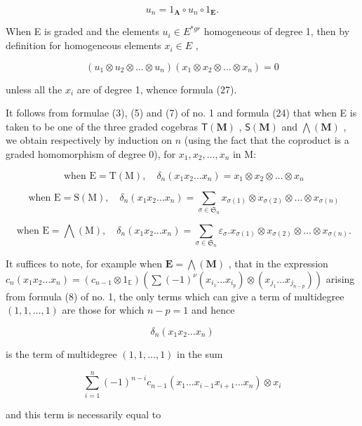 \[
u _ {n} = 1 _ {\mathbf {A}} \circ u _ {n} \circ 1 _ {\mathbf {E}}.
\]

When E is graded and the elements \(u_{i} \in E^{*gr}\) homogeneous of degree 1, then by definition for homogeneous elements \(x_{i} \in E\) ,

\[
(u _ {1} \otimes u _ {2} \otimes \dots \otimes u _ {n}) (x _ {1} \otimes x _ {2} \otimes \dots \otimes x _ {n}) = 0
\]

unless all the \(x_{i}\) are of degree 1, whence formula (27).

It follows from formulae (3), (5) and (7) of no. 1 and formula (24) that when E is taken to be one of the three graded cogebras \(\mathsf{T}(\mathbf{M})\) , \(\mathsf{S}(\mathbf{M})\) and \(\bigwedge (\mathbf{M})\) , we obtain respectively by induction on \(n\) (using the fact that the coproduct is a graded homomorphism of degree 0), for \(x_{1}, x_{2}, \ldots, x_{n}\) in M:

\[
\text { when   } \mathrm{E} = \mathrm{T} (\mathrm{M}), \quad \delta_ {n} (x _ {1} x _ {2} \dots x _ {n}) = x _ {1} \otimes x _ {2} \otimes \dots \otimes x _ {n}
\]

\[
\text { when } \mathrm{E} = \mathrm{S(M)}, \quad \delta_ {n} (x _ {1} x _ {2} \dots x _ {n}) = \sum_ {\sigma \in \mathfrak {S} _ {n}} x _ {\sigma (1)} \otimes x _ {\sigma (2)} \otimes \dots \otimes x _ {\sigma (n)}
\]

\[
\text { when } \mathrm{E} = \bigwedge (\mathrm{M}), \quad \delta_ {n} (x _ {1} x _ {2} \dots x _ {n}) = \sum_ {\sigma \in \mathfrak {S} _ {n}} \varepsilon_ {\sigma}. x _ {\sigma (1)} \otimes x _ {\sigma (2)} \otimes \dots \otimes x _ {\sigma (n)}.
\]

It suffices to note, for example when \(\mathbf{E} = \bigwedge (\mathbf{M})\) , that in the expression \(c_{n}(x_{1}x_{2}\ldots x_{n}) = (c_{n - 1}\otimes 1_{\mathbb{E}})\left(\sum (-1)^{\nu}(x_{i_1}\ldots x_{i_p})\otimes (x_{j_1}\ldots x_{j_{n - p}})\right)\) arising from formula (8) of no. 1, the only terms which can give a term of multidegree \((1,1,\dots ,1)\) are those for which \(n - p = 1\) and hence

\[
\delta_ {n} (x _ {1} x _ {2} \dots x _ {n})
\]

is the term of multidegree \((1, 1, \ldots, 1)\) in the sum

\[
\sum_ {i = 1} ^ {n} (- 1) ^ {n - i} c _ {n - 1} \left(x _ {1} \dots x _ {i - 1} x _ {i + 1} \dots x _ {n}\right) \otimes x _ {i}
\]

and this term is necessarily equal to

